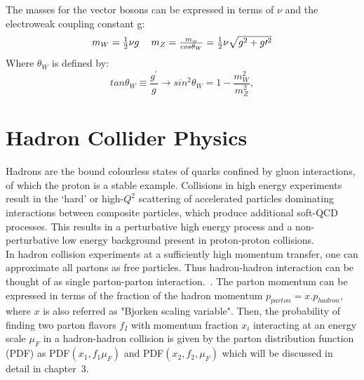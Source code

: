 The masses for the vector bosons can be expressed in terms of $\nu$ and the electroweak coupling constant g:
\begin{equation}
\begin{tabular}{cc}
$m_{W}=\frac{1}{2}\nu g
$&$
m_{Z}=\frac{m_{w}}{cos\theta_{W}}=\frac{1}{2}\nu\sqrt{g^{2}+g\prime^{2}}
$
\end{tabular}
\end{equation}
Where $\theta_{W}$ is defined by:
\begin{equation}
tan\theta_{W}\equiv \frac{g^{\prime}}{g}\longrightarrow sin^{2}\theta_{W}=1-\frac{m_{W}^{2}}{m_{Z}^{2}},
\end{equation}

\section{Hadron Collider Physics}
Hadrons are the bound colourless states of quarks confined by gluon interactions, of which the proton is a stable example. Collisions in high energy experiments result in the ‘hard’ or high-$Q^{2}$ scattering of accelerated particles dominating interactions between composite particles, which produce additional soft-QCD processes. This results in a perturbative high energy process and a non-perturbative low energy background present in proton-proton collisions.\\
In hadron collision experiments at a sufficiently high momentum transfer, one can approximate all partons as free particles. Thus hadron-hadron interaction can be thought of as single parton-parton interaction.~\cite{Mead:2780780}. The parton momentum can be expressed in terms of the fraction of the hadron momentum $p_{parton}=x.p_{hadron}$, where $x$ is also referred as "Bjorken scaling variable". Then, the probability of finding two parton flavors $f_{I}$ with momentum fraction $x_{i}$ interacting at an energy scale $\mu_{F}$
in a hadron-hadron collision is given by the parton distribution function (PDF) as PDF$(x_{1},f_{1}\mu_{F})$ and PDF$(x_{2},f_{2},\mu_{F})$ which will be discussed in detail in chapter~3.


